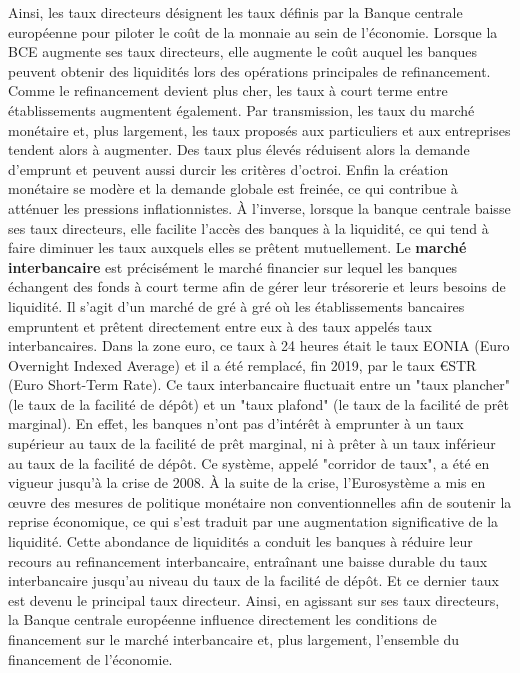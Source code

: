 Ainsi, les taux directeurs désignent les taux définis par la Banque centrale européenne pour piloter le coût de la monnaie au sein de l'économie. Lorsque la BCE augmente ses taux directeurs, elle augmente le coût auquel les banques peuvent obtenir des liquidités lors des opérations principales de refinancement. Comme le refinancement devient plus cher, les taux à court terme entre établissements augmentent également. Par transmission, les taux du marché monétaire et, plus largement, les taux proposés aux particuliers et aux entreprises tendent alors à augmenter. Des taux plus élevés réduisent alors la demande d'emprunt et peuvent aussi durcir les critères d'octroi. Enfin la création monétaire se modère et la demande globale est freinée, ce qui contribue à atténuer les pressions inflationnistes. À l'inverse, lorsque la banque centrale baisse ses taux directeurs, elle facilite l'accès des banques à la liquidité, ce qui tend à faire diminuer les taux auxquels elles se prêtent mutuellement. Le \textbf{marché interbancaire} est précisément le marché financier sur lequel les banques échangent des fonds à court terme afin de gérer leur trésorerie et leurs besoins de liquidité. Il s'agit d'un marché de gré à gré où les établissements bancaires empruntent et prêtent directement entre eux à des taux appelés taux interbancaires. Dans la zone euro, ce taux à 24 heures était le taux EONIA (Euro Overnight Indexed Average) et il a été remplacé, fin 2019, par le taux €STR (Euro Short-Term Rate). Ce taux interbancaire fluctuait entre un "taux plancher" (le taux de la facilité de dépôt) et un "taux plafond" (le taux de la facilité de prêt marginal). En effet, les banques n'ont pas d'intérêt à emprunter à un taux supérieur au taux de la facilité de prêt marginal, ni à prêter à un taux inférieur au taux de la facilité de dépôt. Ce système, appelé "corridor de taux", a été en vigueur jusqu'à la crise de 2008. À la suite de la crise, l'Eurosystème a mis en œuvre des mesures de politique monétaire non conventionnelles afin de soutenir la reprise économique, ce qui s'est traduit par une augmentation significative de la liquidité. Cette abondance de liquidités a conduit les banques à réduire leur recours au refinancement interbancaire, entraînant une baisse durable du taux interbancaire jusqu'au niveau du taux de la facilité de dépôt. Et ce dernier taux est devenu le principal taux directeur. Ainsi, en agissant sur ses taux directeurs, la Banque centrale européenne influence directement les conditions de financement sur le marché interbancaire et, plus largement, l'ensemble du financement de l'économie.



